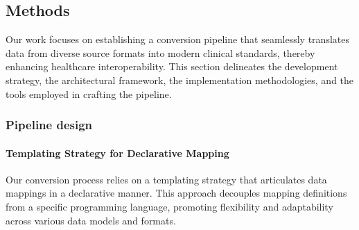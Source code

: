 
\subsection{Methods}\label{sec:paper2_methods}
Our work focuses on establishing a conversion pipeline that seamlessly translates data from diverse source formats into modern clinical standards, thereby enhancing healthcare interoperability. This section delineates the development strategy, the architectural framework, the implementation methodologies, and the tools employed in crafting the pipeline. 

\subsubsection{Pipeline design}

\paragraph{Templating Strategy for Declarative Mapping}
Our conversion process relies on a templating strategy that articulates data mappings in a declarative manner. This approach decouples mapping definitions from a specific programming language, promoting flexibility and adaptability across various data models and formats. 

